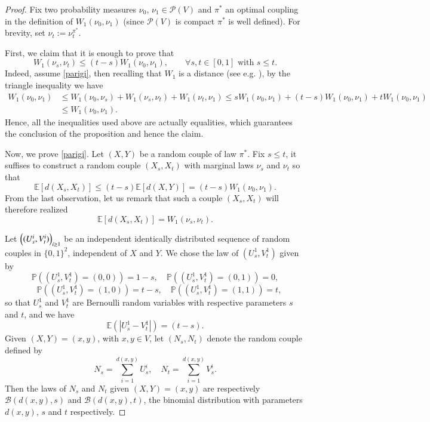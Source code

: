 \documentclass[11pt]{amsart}
\numberwithin{equation}{section}
\begin{document}
\begin{proof}
Fix two probability measures $\nu_0$, $\nu_1 \in \mathcal{P}(V)$ and $\pi^*$ an optimal coupling 
in the definition of $W_1(\nu_0,\nu_1)$ (since $\mathcal{P}(V)$ is compact $\pi^*$ is well defined).
For brevity, set $\nu_t:= \nu_t^{\pi^*}$. 

First, we claim that it is enough to prove that 
\begin{equation} \label{parigi}
W_1(\nu_s,\nu_t) \leq (t-s) W_1(\nu_0,\nu_1), \qquad \forall s,t \in [0,1] \mbox{ with } s \leq t .
\end{equation}
Indeed, assume \eqref{parigi}, then recalling that $W_1$ is a distance (see e.g. \cite{villani}), by the triangle inequality we have
\begin{align*}
W_1(\nu_0,\nu_1) 
& \leq 
W_1(\nu_0,\nu_s) + W_1(\nu_s,\nu_t) + W_1(\nu_t,\nu_1) 
 \leq 
s W_1(\nu_0,\nu_1) + (t-s) W_1(\nu_0,\nu_1) + t W_1(\nu_0,\nu_1) \\
& \leq 
W_1(\nu_0,\nu_1) .
\end{align*}
Hence, all the inequalities used above are actually equalities, which guarantees the conclusion of the proposition and hence the claim. 

Now, we prove \eqref{parigi}.
Let $(X,Y)$ be a random couple of law $\pi^*$. Fix $s \leq t$, it suffises to construct a random couple $(X_s, X_t)$ with marginal laws $\nu_s$ and $\nu_t$ so that 
$${\mathbb{E}}[d(X_s,X_t)]\leq (t-s){\mathbb{E}}[d(X,Y)]= (t-s) W_1(\nu_0,\nu_1).$$
From the last observation, let us remark that such a  couple $(X_s, X_t)$ will therefore realized $${\mathbb{E}}[d(X_s,X_t)]=W_1(\nu_s,\nu_t).$$

Let $\Bigl((U_s^i,V_t^i)\Bigr)_{i\geq 1}$ be   an independent identically distributed sequence of random couples in $\{0,1\}^2$,  independent of $X$ and $Y$. We chose the law of $(U_s^1,V_t^1)$  given by
$${\mathbb{P}}((U_s^1,V_t^1)=(0,0))=1-s,\quad {\mathbb{P}}((U_s^1,V_t^1)=(0,1))=0,$$
$$\quad {\mathbb{P}}((U_s^1,V_t^1)=(1,0))=t-s,\quad {\mathbb{P}}((U_s^1,V_t^1)=(1,1))=t,$$
so that $ U_s^1$ and $V_t^1$ are  Bernoulli random variables with respective parameters $s$ and $t$,
and we have 
$${\mathbb{E}}(|U_s^1-V_t^1|)=(t-s) .$$
Given $(X,Y)=(x,y)$, with $x,y\in V$, let $(N_s ,N_t)$ denote the random couple defined by 
$$N_s= \sum_{i=1}^{d(x,y)} U_s^i, \quad N_t= \sum_{i=1}^{d(x,y)} V_s^i.$$
Then the laws of  $N_s$ and $N_t$ given $(X,Y)=(x,y)$ are respectively  $\mathcal{B}(d(x,y),s)$ and $\mathcal{B}(d(x,y),t)$, the binomial distribution with parameters $d(x,y)$, $s$ and $t$ respectively.


\end{proof}
\end{document}
